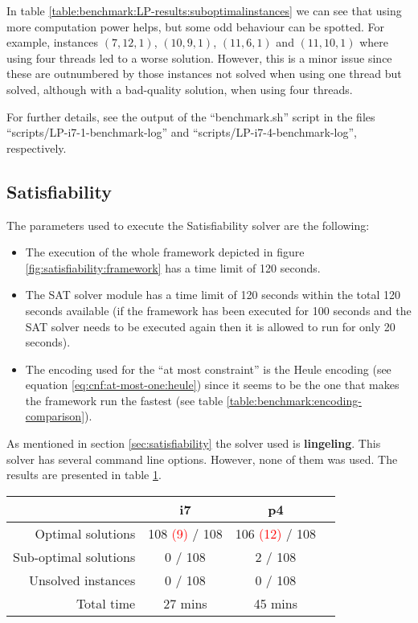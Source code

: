 In table \ref{table:benchmark:LP-results:suboptimalinstances} we can see that using more
computation power helps, but some odd behaviour can be spotted. For example,
instances $(7,12,1)$, $(10,9,1)$, $(11,6,1)$ and $(11,10,1)$  where using four
threads led to a worse solution. However, this is a minor issue since these are
outnumbered by those instances not solved when using one thread but solved,
although with a bad-quality solution, when using four threads.

\hfill

For further details, see the output of the ``benchmark.sh'' script in the files
``scripts/LP-i7-1-benchmark-log'' and ``scripts/LP-i7-4-benchmark-log'', respectively.

\subsection{Satisfiability}
\label{sec:benchmarking:satisfiability}

The parameters used to execute the Satisfiability solver are the following:
\begin{itemize}
	\item The execution of the whole framework depicted in figure \ref{fig:satisfiability:framework}
	has a time limit of 120 seconds.
	\item The SAT solver module has a time limit of 120 seconds within the total 120 seconds
	available (if the framework has been executed for 100 seconds and the SAT solver needs
	to be executed again then it is allowed to run for only 20 seconds).
	\item The encoding used for the ``at most constraint'' is the Heule encoding 
	(see equation \ref{eq:cnf:at-most-one:heule}) since it seems to be the one that makes the framework
	run the fastest (see table \ref{table:benchmark:encoding-comparison}).
\end{itemize}

As mentioned in section \ref{sec:satisfiability} the solver used is \textbf{lingeling}\cite{lingeling}.
This solver has several command line options. However, none of them was used. The results
are presented in table \ref{table:benchmark:SAT-results}.

\begin{table}[H]
\centering
	\begin{tabular}{rccc}
								& i7 	& p4 \\
		\midrule
		Optimal solutions		& 108 \textcolor{red}{(9)} / 108
											& 106 \textcolor{red}{(12)} / 108 \\
		Sub-optimal solutions	& 0 / 108	& 2 / 108 \\
		Unsolved instances		& 0 / 108	& 0 / 108 \\
		Total time				& 27 mins	& 45 mins \\
	\end{tabular}
	\label{table:benchmark:SAT-results}
\end{table}

